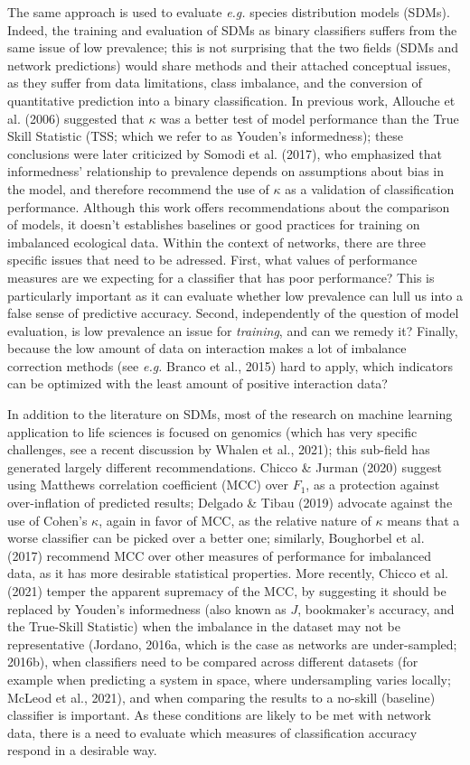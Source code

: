 \documentclass[10pt,oneside]{article}
\begin{document}
The same approach is used to evaluate \emph{e.g.} species distribution
models (SDMs). Indeed, the training and evaluation of SDMs as binary
classifiers suffers from the same issue of low prevalence; this is not
surprising that the two fields (SDMs and network predictions) would
share methods and their attached conceptual issues, as they suffer from
data limitations, class imbalance, and the conversion of quantitative
prediction into a binary classification. In previous work, Allouche et
al. (2006) suggested that \(\kappa\) was a better test of model
performance than the True Skill Statistic (TSS; which we refer to as
Youden's informedness); these conclusions were later criticized by
Somodi et al. (2017), who emphasized that informedness' relationship to
prevalence depends on assumptions about bias in the model, and therefore
recommend the use of \(\kappa\) as a validation of classification
performance. Although this work offers recommendations about the
comparison of models, it doesn't establishes baselines or good practices
for training on imbalanced ecological data. Within the context of
networks, there are three specific issues that need to be adressed.
First, what values of performance measures are we expecting for a
classifier that has poor performance? This is particularly important as
it can evaluate whether low prevalence can lull us into a false sense of
predictive accuracy. Second, independently of the question of model
evaluation, is low prevalence an issue for \emph{training}, and can we
remedy it? Finally, because the low amount of data on interaction makes
a lot of imbalance correction methods (see \emph{e.g.} Branco et al.,
2015) hard to apply, which indicators can be optimized with the least
amount of positive interaction data?

In addition to the literature on SDMs, most of the research on machine
learning application to life sciences is focused on genomics (which has
very specific challenges, see a recent discussion by Whalen et al.,
2021); this sub-field has generated largely different recommendations.
Chicco \& Jurman (2020) suggest using Matthews correlation coefficient
(MCC) over \(F_1\), as a protection against over-inflation of predicted
results; Delgado \& Tibau (2019) advocate against the use of Cohen's
\(\kappa\), again in favor of MCC, as the relative nature of \(\kappa\)
means that a worse classifier can be picked over a better one;
similarly, Boughorbel et al. (2017) recommend MCC over other measures of
performance for imbalanced data, as it has more desirable statistical
properties. More recently, Chicco et al. (2021) temper the apparent
supremacy of the MCC, by suggesting it should be replaced by Youden's
informedness (also known as \(J\), bookmaker's accuracy, and the
True-Skill Statistic) when the imbalance in the dataset may not be
representative (Jordano, 2016a, which is the case as networks are
under-sampled; 2016b), when classifiers need to be compared across
different datasets (for example when predicting a system in space, where
undersampling varies locally; McLeod et al., 2021), and when comparing
the results to a no-skill (baseline) classifier is important. As these
conditions are likely to be met with network data, there is a need to
evaluate which measures of classification accuracy respond in a
desirable way.
\end{document}
